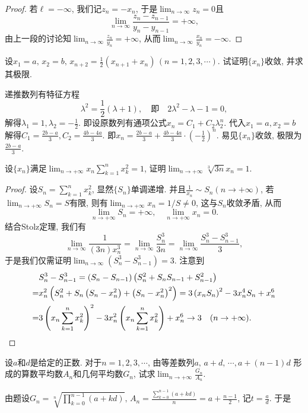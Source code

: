 \begin{quiza}
\begin{proof}
若\(\ell=-\infty\), 我们记\(z_n=-x_n\), 于是\(\lim_{n\rightarrow\infty}z_n=0\)且\[\lim_{n\rightarrow\infty}\frac{z_n-z_{n-1}}{y_n-y_{n-1}}=+\infty,\]由上一段的讨论知\(\lim_{n\rightarrow\infty}\frac{z_n}{y_n}=+\infty\), 从而\(\lim_{n\rightarrow\infty}\frac{x_n}{y_n}=-\infty.\)
\end{proof}
\woe 设\(x_1=a,\,x_2=b,\,x_{n+2}=\frac{1}{2}(x_{n+1}+x_n)\,(n=1,2,3,\cdots)\). 试证明\(\{x_n\}\)收敛, 并求其极限.
\begin{solution}
递推数列有特征方程\[\lambda^2=\frac{1}{2}(\lambda+1),\quad\text{即}\quad 2\lambda^2-\lambda-1=0,\]解得\(\lambda_1=1,\lambda_2=-\frac{1}{2}\). 即设原数列有通项公式\(x_n=C_1+C_2\lambda_2^n\). 代入\(x_1=a,x_2=b\)解得\(C_1=\frac{2b-a}{3},C_2=\frac{4b-4a}{3}.\) 即\(x_n=\frac{2b-a}{3}+\frac{4b-4a}{3}\cdot\left(-\frac{1}{2}\right)^n.\) 易见\(\{x_n\}\)收敛, 极限为\(\frac{2b-a}{3}\).
\end{solution}
\woe 设\(\{x_n\}\)满足\(\lim_{n\rightarrow+\infty}x_{n}\sum_{k=1}^{n}x_k^2=1\), 证明\(\lim_{n\rightarrow+\infty}\sqrt[3]{3n}x_{n}=1\).
\begin{proof}
设\(S_n=\sum_{k=1}^{n}x_k^2\), 显然\(\{S_n\}\)单调递增. 并且\(\frac{1}{x_n}\sim S_n(n\rightarrow+\infty)\), 若\(\lim_{n\rightarrow+\infty}S_n=S\)有限, 则有\(\lim_{n\rightarrow+\infty}x_n=1/S\ne 0\), 这与\(S_n\)收敛矛盾, 从而\[\lim_{n\rightarrow+\infty}S_n=+\infty,\quad\lim_{n\rightarrow+\infty}x_n=0.\]
结合Stolz定理, 我们有\[\lim_{n\rightarrow\infty}\frac{1}{(3n)x_n^3}=\lim_{n\rightarrow\infty}\frac{S_n^3}{3n}=\lim_{n\rightarrow\infty}\frac{S_n^3-S_{n-1}^3}{3},\]于是我们仅需证明\(\lim_{n\rightarrow\infty}\left(S_n^3-S_{n-1}^3\right)=3\). 注意到\[\begin{split}
&S_n^3-S_{n-1}^3=(S_n-S_{n-1})\left(S_n^2+S_nS_{n-1}+S_{n-1}^2\right)\\=&x_n^2\left(S_n^2+S_n\left(S_n-x_n^2\right)+\left(S_n-x_n^2\right)^2\right)=3\left(x_nS_n\right)^2-3x_n^4S_n+x_n^6\\=&3\left(x_n\sum_{k=1}^{n}x_k^2\right)^2-3x_n^2\left(x_n\sum_{k=1}^{n}x_k^2\right)+x_n^6\rightarrow3\quad (n\rightarrow +\infty).\qedhere
\end{split}\]
\end{proof}
\woe 设\(a\)和\(d\)是给定的正数. 对于\(n=1,2,3,\cdots\), 由等差数列\(a,\,a+d,\,\cdots,a+(n-1)d\) 形成的算数平均数\(A_n\)和几何平均数\(G_n\), 试求\(\lim_{n\rightarrow+\infty}\frac{G_n}{A_n}\).
\begin{solution}
由题设\(G_n=\sqrt[n]{\prod_{k=0}^{n-1}\left(a+kd\right)},\,A_n=\frac{\displaystyle\sum_{k=0}^{n-1}\left(a+kd\right)}{n}=a+\frac{n-1}{2}\), 记\(t=\frac{a}{d}\). 于是\[\begin{split}

\end{split}\]
\end{solution}
\end{quiza}

